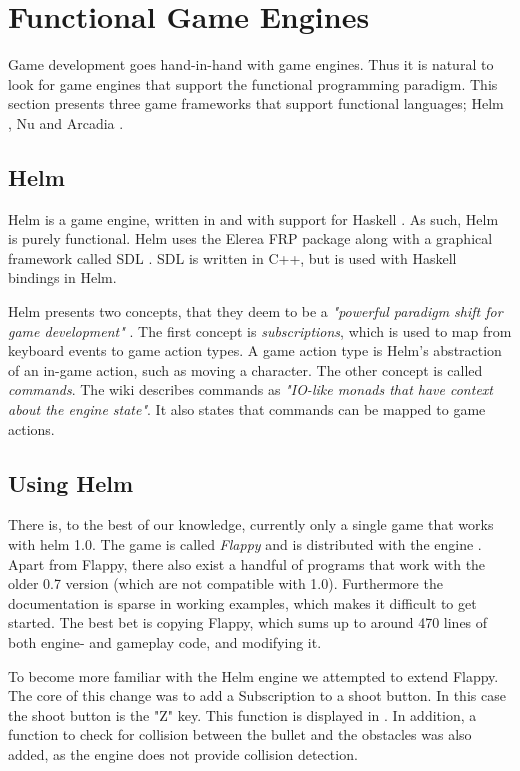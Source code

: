 \section{Functional Game Engines} \label{sec:functional-game-engines}
Game development goes hand-in-hand with game engines. Thus it is natural to look for game engines that support the functional programming paradigm. This section presents three game frameworks that support functional languages; Helm \cite{helm:github}, Nu \cite{nu:github} and Arcadia \cite{arcadia:github}.

\subsection{Helm}
Helm is a game engine, written in and with support for Haskell \cite{helm:github,helm:wiki}. As such, Helm is purely functional. Helm uses the Elerea \ac{FRP} package along with a graphical framework called \ac{SDL} \cite{libsdl:about}. \ac{SDL} is written in C++, but is used with Haskell bindings in Helm.

Helm presents two concepts, that they deem to be a \textit{"powerful paradigm shift for game development"} \cite{helm:wiki}. The first concept is \textit{subscriptions}, which is used to map from keyboard events to game action types. A game action type is Helm's abstraction of an in-game action, such as moving a character. The other concept is called \textit{commands}. The wiki describes commands as \textit{"IO-like monads that have context about the engine state"}. It also states that commands can be mapped to game actions.

\subsection{Using Helm}
There is, to the best of our knowledge, currently only a single game that works with helm 1.0. The game is called \textit{Flappy} and is distributed with the engine \cite{hs-helm-flabby-shooter:github}. Apart from Flappy, there also exist a handful of programs that work with the older 0.7 version (which are not compatible with 1.0). Furthermore the documentation is sparse in working examples, which makes it difficult to get started. The best bet is copying Flappy, which sums up to around 470 lines of both engine- and gameplay code, and modifying it.

To become more familiar with the Helm engine we attempted to extend Flappy. The core of this change was to add a Subscription to a shoot button. In this case the shoot button is the "Z" key. This function is displayed in . In addition, a function to check for collision between the bullet and the obstacles was also added, as the engine does not provide collision detection.

